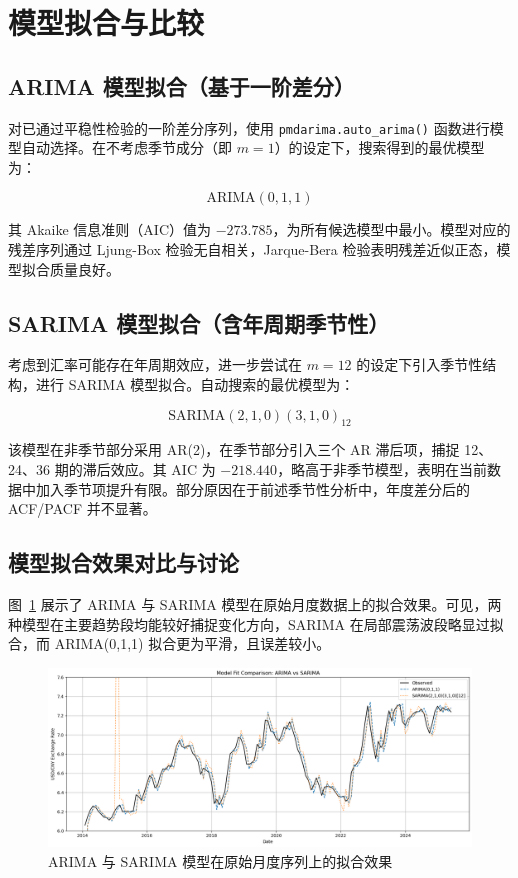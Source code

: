 \documentclass[11pt,a4paper]{article}
\begin{document}
\section{模型拟合与比较}

\subsection{ARIMA 模型拟合（基于一阶差分）}

对已通过平稳性检验的一阶差分序列，使用 \texttt{pmdarima.auto\_arima()} 函数进行模型自动选择。在不考虑季节成分（即 $m=1$）的设定下，搜索得到的最优模型为：

\[
\text{ARIMA}(0,1,1)
\]

其 Akaike 信息准则（AIC）值为 $-273.785$，为所有候选模型中最小。模型对应的残差序列通过 Ljung-Box 检验无自相关，Jarque-Bera 检验表明残差近似正态，模型拟合质量良好。

\subsection{SARIMA 模型拟合（含年周期季节性）}

考虑到汇率可能存在年周期效应，进一步尝试在 $m=12$ 的设定下引入季节性结构，进行 SARIMA 模型拟合。自动搜索的最优模型为：

\[
\text{SARIMA}(2,1,0)(3,1,0)_{12}
\]

该模型在非季节部分采用 AR(2)，在季节部分引入三个 AR 滞后项，捕捉 12、24、36 期的滞后效应。其 AIC 为 $-218.440$，略高于非季节模型，表明在当前数据中加入季节项提升有限。部分原因在于前述季节性分析中，年度差分后的 ACF/PACF 并不显著。

\subsection{模型拟合效果对比与讨论}

图~\ref{fig:fit-comparison} 展示了 ARIMA 与 SARIMA 模型在原始月度数据上的拟合效果。可见，两种模型在主要趋势段均能较好捕捉变化方向，SARIMA 在局部震荡波段略显过拟合，而 ARIMA(0,1,1) 拟合更为平滑，且误差较小。

\begin{figure}[H]
  \centering
  \includegraphics[width=1\textwidth]{./figures/ARIMA vs SARIMA.png}
  \caption{ARIMA 与 SARIMA 模型在原始月度序列上的拟合效果}
  \label{fig:fit-comparison}
\end{figure}
\end{document}
